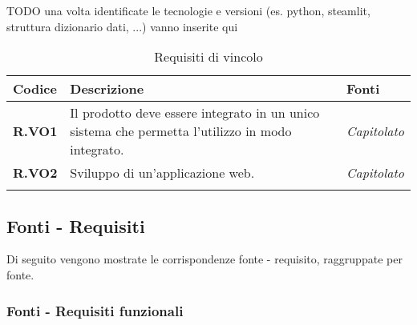 TODO una volta identificate le tecnologie e versioni (es. python, steamlit, struttura dizionario dati, ...) vanno inserite qui
\begin{longtable}{|P{3cm}|P{6,5cm}|>{\arraybackslash}P{4cm}|}
  \hline
  \textbf{Codice} & \textbf{Descrizione} & \textbf{Fonti} \\
  \hline
  \textbf{R.VO1} & Il prodotto deve essere integrato in un unico sistema che permetta l'utilizzo in modo integrato. & \emph{Capitolato} \\
  \hline
  \textbf{R.VO2} & Sviluppo di un'applicazione web. & \emph{Capitolato} \\
  \hline
\caption{Requisiti di vincolo}
\label{requisitivincolo}
\end{longtable}

\subsection{Fonti - Requisiti}
Di seguito vengono mostrate le corrispondenze fonte - requisito, raggruppate per fonte.

\subsubsection{Fonti - Requisiti funzionali}


